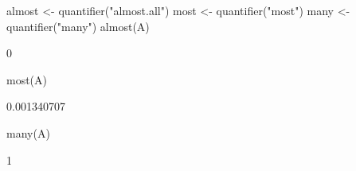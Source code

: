 \begin{Schunk}
% --begin: "quant5"
\begin{Sinput}
 almost <- quantifier("almost.all")
 most <- quantifier("most")
 many <- quantifier("many")
 almost(A)
\end{Sinput}
\begin{Soutput}
[1] 0
\end{Soutput}
\begin{Sinput}
 most(A)
\end{Sinput}
\begin{Soutput}
[1] 0.001340707
\end{Soutput}
\begin{Sinput}
 many(A)
\end{Sinput}
\begin{Soutput}
[1] 1
\end{Soutput}
%
% --end: "quant5"
\end{Schunk}
